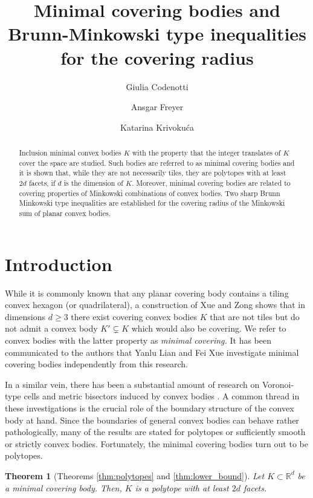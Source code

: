 \documentclass[11pt, a4paper]{amsart}
\title[Minimal covering bodies]{Minimal covering bodies and Brunn-Minkowski type inequalities for the covering radius}
\author[G.\ Codenotti]{Giulia Codenotti}
\author[A.\ Freyer]{Ansgar Freyer}
\author[K.\ Krivoku\'{c}a]{Katarina Krivoku\'{c}a}
\date{}
\newcommand{\RR}{\mathbb{R}}
\numberwithin{equation}{section}
\theoremstyle{plain}
\newtheorem{theorem}{Theorem}[section]
\begin{document}
\maketitle

\begin{abstract}
Inclusion minimal convex bodies $K$ with the property that the integer translates of $K$ cover the space are studied. Such bodies are referred to as minimal covering bodies and it is shown that, while they are not necessarily tiles, they are polytopes with at least $2d$ facets, if $d$ is the dimension of $K$. Moreover, minimal covering bodies are related to covering properties of Minkowski combinations of convex bodies. Two sharp Brunn Minkowski type inequalities are established for the covering radius of the Minkowski sum of planar convex bodies. 
\end{abstract}

\section{Introduction}



While it is commonly known that any planar covering body contains a tiling convex hexagon (or quadrilateral), a construction of Xue and Zong \cite{xuezong} shows that in dimensions $d\geq 3$ there exist covering convex bodies $K$ that are not tiles but do not admit a convex body $K'\subsetneq K$ which would also be covering. We refer to convex bodies with the latter property as \emph{minimal covering.} 
It has been communicated to the authors that Yanlu Lian and Fei Xue investigate minimal covering bodies independently from this research.

In a similar vein, there has been a substantial amount of research on Voronoi-type cells and metric bisectors induced by convex bodies \cite{blomerkohn, criadojoswigsantos, jaljochemko, xuezong}. A common thread in these investigations is the crucial role of the boundary structure of the convex body at hand. Since the boundaries of general convex bodies can behave rather pathologically, many of the results are stated for polytopes or sufficiently smooth or strictly convex bodies. Fortunately, the minimal covering bodies turn out to be polytopes.

\begin{theorem}[Theorems \ref{thm:polytopes} and \ref{thm:lower_bound}]
\label{thm:main}
Let $K\subset\RR^d$ be a minimal covering body. Then, $K$ is a polytope with at least $2d$ facets.
\end{theorem}
\end{document}
